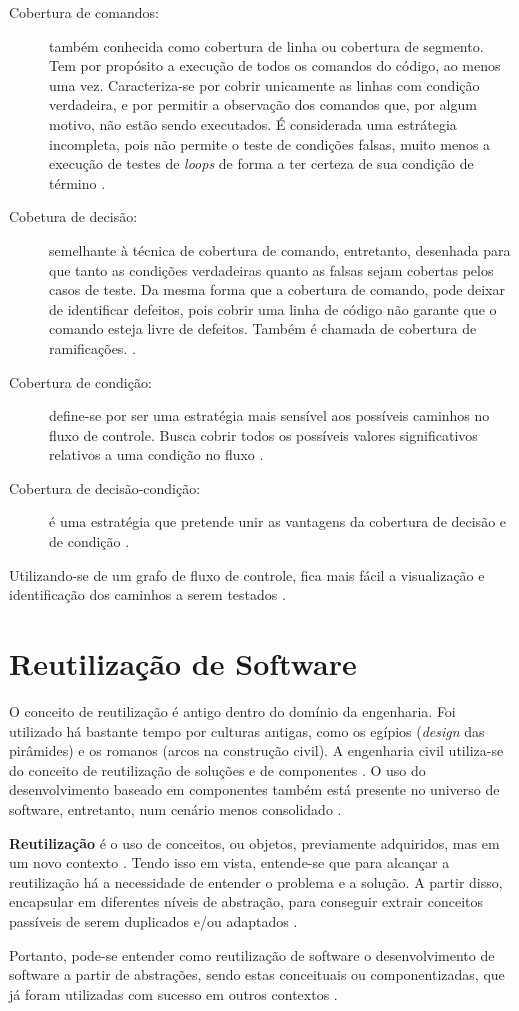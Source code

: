 \begin{description}
\item[Cobertura de comandos:] também conhecida como cobertura de linha ou
cobertura de segmento. Tem por propósito a execução de todos os comandos do
código, ao menos uma vez. Caracteriza-se por cobrir unicamente as linhas com
condição verdadeira, e por permitir a observação dos comandos que, por algum
motivo, não estão sendo executados. É considerada uma estrátegia incompleta,
pois não permite o teste de condições falsas, muito menos a execução de testes
de \textit{loops} de forma a ter certeza de sua condição de término
\cite{myers2004}.
\item[Cobetura de decisão:] semelhante à técnica de cobertura de comando,
entretanto, desenhada para que tanto as condições verdadeiras quanto as falsas
sejam cobertas pelos casos de teste. Da mesma forma que a cobertura de comando,
pode deixar de identificar defeitos, pois cobrir uma linha de código não
garante que o comando esteja livre de defeitos. Também é chamada de cobertura
de ramificações. \cite{myers2004}.
\item[Cobertura de condição:] define-se por ser uma estratégia mais sensível
aos possíveis caminhos no fluxo de controle. Busca cobrir todos os possíveis
valores significativos relativos a uma condição no fluxo \cite{myers2004}.
\item[Cobertura de decisão-condição:] é uma estratégia que pretende unir as
vantagens da cobertura de decisão e de condição \cite{myers2004}.
\end{description}
\par
\indent Utilizando-se de um grafo de fluxo de controle, fica mais fácil a
visualização e identificação dos caminhos a serem testados \cite{copeland2003}.
\par
\section{Reutilização de Software}
O conceito de reutilização é antigo dentro do domínio da engenharia. Foi
utilizado há bastante tempo por culturas antigas, como os egípios
(\textit{design} das pirâmides) e os romanos (arcos na construção civil).
A engenharia civil utiliza-se do conceito de reutilização de soluções e de
componentes \cite{sutcliffe2002}. O uso do desenvolvimento baseado em
componentes também está presente no universo de software, entretanto, num
cenário menos consolidado \cite{sutcliffe2002}.
\par
\indent \textbf{Reutilização} é o uso de conceitos, ou objetos, previamente
adquiridos, mas em um novo contexto \cite{sutcliffe2002}. Tendo isso em vista,
entende-se que para alcançar a reutilização há a necessidade de entender o
problema e a solução. A partir disso, encapsular em diferentes níveis de
abstração, para conseguir extrair conceitos passíveis de serem duplicados e/ou
adaptados \cite{sutcliffe2002}.
\par
\indent Portanto, pode-se entender como reutilização de software o
desenvolvimento de software a partir de abstrações, sendo estas conceituais ou
componentizadas, que já foram utilizadas com sucesso em outros contextos
\cite{sutcliffe2002}.

